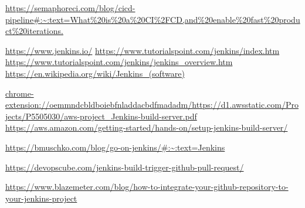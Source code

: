 \documentclass[12pt,a4paper,twoside]{article}
\begin{document}
\begin{thebibliography}{100}

	 \url{https://semaphoreci.com/blog/cicd-pipeline#:~:text=What\%20is\%20a\%20CI\%2FCD,and\%20enable\%20fast\%20product\%20iterations.}	

	\bibitem{} \url{https://www.jenkins.io/}
	\bibitem{} \url{https://www.tutorialspoint.com/jenkins/index.htm}
	 \url{https://www.tutorialspoint.com/jenkins/jenkins_overview.htm}
	\bibitem{} \url{https://en.wikipedia.org/wiki/Jenkins_(software)}

	\bibitem{} \url{chrome-extension://oemmndcbldboiebfnladdacbdfmadadm/https://d1.awsstatic.com/Projects/P5505030/aws-project_Jenkins-build-server.pdf}
	 \url{https://aws.amazon.com/getting-started/hands-on/setup-jenkins-build-server/}

	\bibitem{} \url{https://bmuschko.com/blog/go-on-jenkins/#:~:text=Jenkins}

	\bibitem{} \url{https://devopscube.com/jenkins-build-trigger-github-pull-request/}


	\bibitem{} \url{https://www.blazemeter.com/blog/how-to-integrate-your-github-repository-to-your-jenkins-project}


\end{thebibliography}
\end{document}

